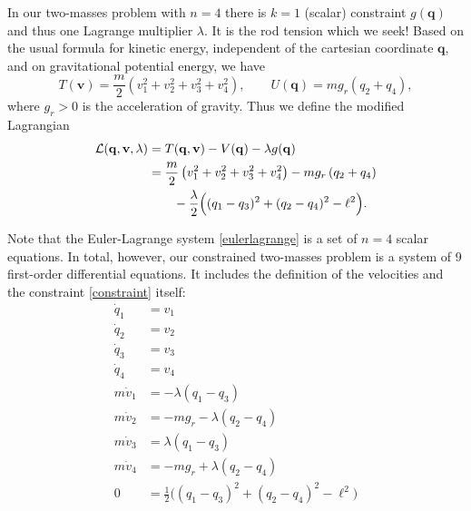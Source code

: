 \documentclass[letterpaper,final,12pt,reqno]{amsart}
\newcommand{\bq}{\mathbf{q}}
\newcommand{\bv}{\mathbf{v}}
\begin{document}
In our two-masses problem with $n=4$ there is $k=1$ (scalar) constraint $g(\bq)$ and thus one Lagrange multiplier $\lambda$.  It is the rod tension which we seek!  Based on the usual formula for kinetic energy, independent of the cartesian coordinate $\bq$, and on gravitational potential energy, we have
\begin{equation}
T(\bv) = \frac{m}{2} \left(v_1^2+v_2^2+v_3^2+v_4^2\right), \qquad U(\bq) = m g_r \left(q_2+q_4\right), \label{energies}
\end{equation}
where $g_r>0$ is the acceleration of gravity.  Thus we define the modified Lagrangian
\begin{align}
\mathcal{L}(\bq,\bv,\lambda) &= T(\bq,\bv) - V(\bq) - \lambda g(\bq) \label{lagrangian} \\
  &= \frac{m}{2} \left(v_1^2+v_2^2+v_3^2+v_4^2\right) - m g_r \left(q_2+q_4\right) \notag \\
  &\qquad - \frac{\lambda}{2} \Big((q_1 - q_3)^2 + (q_2 - q_4)^2 - \ell^2\Big). \notag
\end{align}

Note that the Euler-Lagrange system \eqref{eulerlagrange} is a set of $n=4$ scalar equations.  In total, however, our constrained two-masses problem is a system of 9 first-order differential equations.  It includes the definition of the velocities and the constraint \eqref{constraint} itself:
\begin{subequations}
\label{rawsystem}
\begin{align}
  \dot q_1 &= v_1 \\
  \dot q_2 &= v_2 \\
  \dot q_3 &= v_3 \\
  \dot q_4 &= v_4 \\
m \dot v_1 &= - \lambda (q_1 - q_3) \\
m \dot v_2 &= - m g_r - \lambda (q_2 - q_4) \\
m \dot v_3 &= \lambda (q_1 - q_3) \\
m \dot v_4 &= - m g_r + \lambda (q_2 - q_4) \\
         0 &= \frac{1}{2} \Big((q_1 - q_3)^2 + (q_2 - q_4)^2 - \ell^2\Big) \label{rawsystem:constraint}
\end{align}
\end{subequations}
\end{document}
